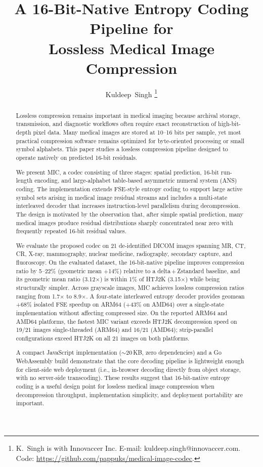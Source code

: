 \documentclass[journal]{IEEEtran}
\title{A 16-Bit-Native Entropy Coding Pipeline for\\
       Lossless Medical Image Compression}
\author{Kuldeep~Singh%
\thanks{K.\ Singh is with Innovaccer Inc.
E-mail: kuldeep.singh@innovaccer.com.
Code: \url{https://github.com/pappuks/medical-image-codec}.}%
}
\begin{document}
\maketitle

\begin{abstract}
Lossless compression remains important in medical imaging because archival
storage, transmission, and diagnostic workflows often require exact
reconstruction of high-bit-depth pixel data. Many medical images are stored at
10--16 bits per sample, yet most practical compression software remains
optimized for byte-oriented processing or small symbol alphabets. This paper
studies a lossless compression pipeline designed to operate natively on
predicted 16-bit residuals.

We present MIC, a codec consisting of three stages: spatial prediction, 16-bit
run-length encoding, and large-alphabet table-based asymmetric numeral system
(ANS) coding. The implementation extends FSE-style entropy coding to support
large active symbol sets arising in medical image residual streams and includes
a multi-state interleaved decoder that increases instruction-level parallelism
during decompression. The design is motivated by the observation that, after
simple spatial prediction, many medical images produce residual distributions
sharply concentrated near zero with frequently repeated 16-bit residual values.

We evaluate the proposed codec on 21 de-identified DICOM images spanning MR,
CT, CR, X-ray, mammography, nuclear medicine, radiography, secondary capture,
and fluoroscopy. On the evaluated dataset, the 16-bit-native pipeline improves
compression ratio by 5--22\% (geometric mean $+$14\%) relative to a
delta\,+\,Zstandard baseline, and its geometric mean ratio (3.12$\times$)
is within 1\% of HTJ2K (3.15$\times$) while being structurally simpler.
Across grayscale images, MIC achieves lossless
compression ratios ranging from 1.7$\times$ to 8.9$\times$. A four-state
interleaved entropy decoder provides geomean $+$68\% isolated FSE speedup on
ARM64 ($+$43\% on AMD64) over a single-state implementation without affecting
compressed size. On the reported
ARM64 and AMD64 platforms, the fastest MIC variant exceeds HTJ2K decompression
speed on 19/21 images single-threaded (ARM64) and 16/21 (AMD64);
strip-parallel configurations exceed HTJ2K on all 21 images on both platforms.

A compact JavaScript implementation (${\sim}$20\,KB, zero dependencies) and a
Go WebAssembly build demonstrate that the core decoding pipeline is lightweight
enough for client-side web deployment (i.e., in-browser decoding directly from
object storage, with no server-side transcoding). These results suggest that 16-bit-native
entropy coding is a useful design point for lossless medical image compression
when decompression throughput, implementation simplicity, and deployment
portability are important.
\end{abstract}
\end{document}
